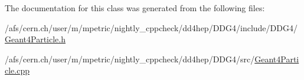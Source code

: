 The documentation for this class was generated from the following files\+:\begin{DoxyCompactItemize}
\item 
/afs/cern.\+ch/user/m/mpetric/nightly\+\_\+cppcheck/dd4hep/\+D\+D\+G4/include/\+D\+D\+G4/\hyperlink{_geant4_particle_8h}{Geant4\+Particle.\+h}\item 
/afs/cern.\+ch/user/m/mpetric/nightly\+\_\+cppcheck/dd4hep/\+D\+D\+G4/src/\hyperlink{_geant4_particle_8cpp}{Geant4\+Particle.\+cpp}\end{DoxyCompactItemize}
